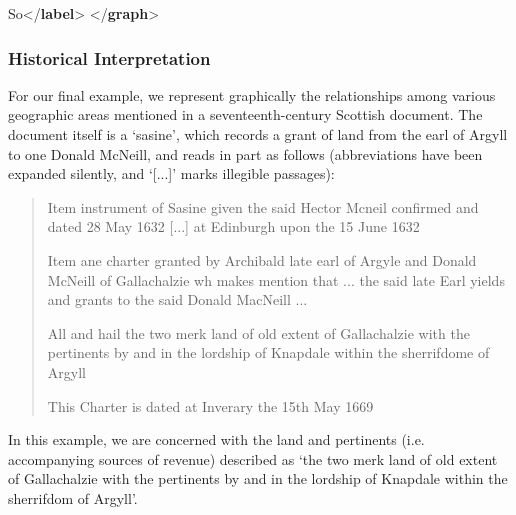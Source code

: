 \begin{shaded}
\mbox{}\newline 
\hspace*{1em}So{</\textbf{label}>}\mbox{}\newline 
{}\mbox{}\newline 
{</\textbf{graph}>}\end{shaded}\egroup\par \noindent    
\subsubsection[{Historical Interpretation}]{Historical Interpretation}\label{GDHI}\par
For our final example, we represent graphically the relationships among various geographic areas mentioned in a seventeenth-century Scottish document. The document itself is a ‘sasine’, which records a grant of land from the earl of Argyll to one Donald McNeill, and reads in part as follows (abbreviations have been expanded silently, and ‘[...]’ marks illegible passages): 
\begin{quote}\par
Item instrument of Sasine given the said Hector Mcneil confirmed and dated 28 May 1632 [...] at Edinburgh upon the 15 June 1632 \par
Item ane charter granted by Archibald late earl of Argyle and Donald McNeill of Gallachalzie wh makes mention that ... the said late Earl yields and grants to the said Donald MacNeill ... \par
All and hail the two merk land of old extent of Gallachalzie with the pertinents by and in the lordship of Knapdale within the sherrifdome of Argyll \par
[description of other lands granted follows ...] \par
This Charter is dated at Inverary the 15th May 1669\end{quote}
\par
In this example, we are concerned with the land and pertinents (i.e. accompanying sources of revenue) described as ‘the two merk land of old extent of Gallachalzie with the pertinents by and in the lordship of Knapdale within the sherrifdom of Argyll’.\par
